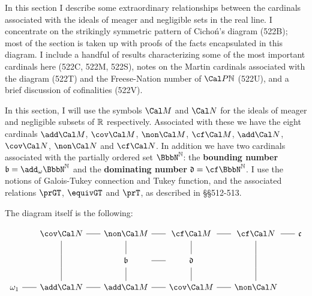 
\def\chaptername{Cardinal functions of measure theory}
\def\sectionname{Cicho\'n's diagram}

\def\finint{\text{\tt finint}}
\def\disj{\text{\tt disj}}


In this section I describe some extraordinary relationships between the
cardinals associated with the ideals of meager and negligible sets in
the real line.   I concentrate on the strikingly symmetric pattern of
Cicho\'n's diagram (522B);  most of the section is taken up with proofs
of the facts encapsulated in this diagram.   I include a handful of
results characterizing some of the most important cardinals here (522C,
522M, 522S), notes on the Martin cardinals associated with the diagram
(522T) and the Freese-Nation number of $\Cal P\Bbb N$ (522U), and a
brief discussion of cofinalities (522V).

 In this section, I will use the symbols $\Cal M$
and $\Cal N$ for the ideals of meager and negligible subsets of
$\Bbb R$ respectively.   Associated with these we have the eight
cardinals $\add\Cal M$,
$\cov\Cal M$, $\non\Cal M$, $\cf\Cal M$, $\add\Cal N$, $\cov\Cal N$,
$\non\Cal N$ and $\cf\Cal N$.   In addition we have two
cardinals associated with the partially ordered set $\NN$:  the {\bf
bounding number} $\frak b=\add_{\omega}\NN$ and the {\bf dominating number}
$\frak d=\cf\NN$.
I use the notions of Galois-Tukey connection and Tukey function, and the
associated relations $\prGT$, $\equivGT$ and $\prT$, as described in
\S\S512-513.

 The diagram itself is the following:

\def\tmphrule{\hskip0.4em\raise
2.5pt\hbox{\leaders\hrule\hskip1.7em\hfil}\hskip0.4em}
\def\tmpstrut{\vrule height10.5pt depth5.5pt width0pt}

$$\vbox{\offinterlineskip
\halign{\hfil#\hfil&\hfil#\hfil&\hfil#\hfil&\hfil#\hfil
  &\hfil#\hfil&\hfil#\hfil&\hfil#\hfil
  &\hfil#\hfil&\hfil#\hfil&\hfil#\hfil&\hfil#\hfil\cr
&\tmpstrut&$\cov\Cal N$&\tmphrule&$\non\Cal M$&\tmphrule
  &$\cf\Cal M$&\tmphrule&$\cf\Cal N$&\tmphrule&$\frak c$\cr
&\tmpstrut&\vrule&&\vrule&&\vrule&&\vrule\cr
&\tmpstrut&\vrule&&$\frak b$&\tmphrule&$\frak d$&&\vrule\cr
&\tmpstrut&\vrule&&\vrule&&\vrule&&\vrule\cr
$\tmpstrut\omega_1$&\tmphrule&$\add\Cal N$&\tmphrule
  &$\add\Cal M$&\tmphrule&$\cov\Cal M$&\tmphrule&$\non\Cal N$\cr
}}$$


